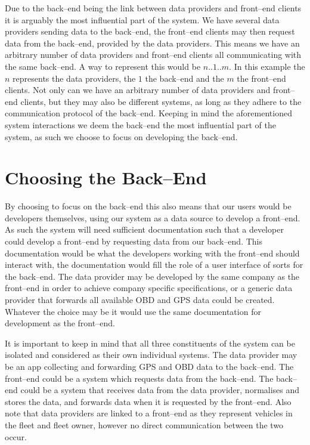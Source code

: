 \bigskip
Due to the back--end being the link between data providers and front--end clients it is arguably the most influential part of the system.
We have several data providers sending data to the back--end, the front--end clients may then request data from the back--end, provided by the data providers.
This means we have an arbitrary number of data providers and front--end clients all communicating with the same back--end.
A way to represent this would be $n..1..m$.
In this example the $n$ represents the data providers, the $1$ the back--end and the $m$ the front--end clients.
Not only can we have an arbitrary number of data providers and front--end clients, but they may also be different systems, as long as they adhere to the communication protocol of the back--end.
Keeping in mind the aforementioned system interactions we deem the back--end the most influential part of the system, as such we choose to focus on developing the back--end.

\section{Choosing the Back--End}
By choosing to focus on the back--end this also means that our users would be developers themselves, using our system as a data source to develop a front--end.
As such the system will need sufficient documentation such that a developer could develop a front--end by requesting data from our back--end.
This documentation would be what the developers working with the front--end should interact with, the documentation would fill the role of a user interface of sorts for the back--end.
The data provider may be developed by the same company as the front--end in order to achieve company specific specifications, or a generic data provider that forwards all available \ac{OBD} and GPS data could be created.
Whatever the choice may be it would use the same documentation for development as the front--end.

It is important to keep in mind that all three constituents of the system can be isolated and considered as their own individual systems.
The data provider may be an app collecting and forwarding GPS and \ac{OBD} data to the back--end.
The front--end could be a system which requests data from the back--end.
The back--end could be a system that receives data from the data provider, normalises and stores the data, and forwards data when it is requested by the front--end.
Also note that data providers are linked to a front--end as they represent vehicles in the fleet and fleet owner, however no direct communication between the two occur.

